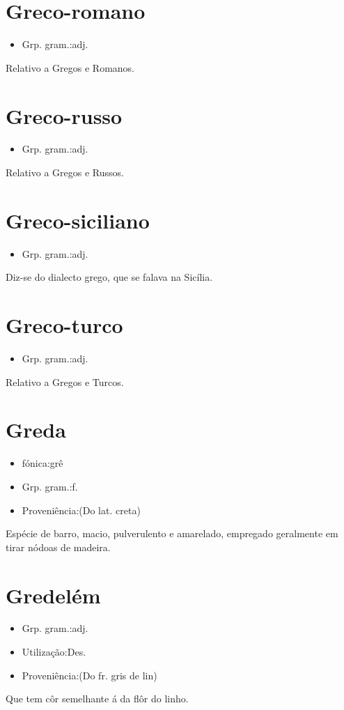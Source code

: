 \section{Greco-romano}
\begin{itemize}
\item {Grp. gram.:adj.}
\end{itemize}
Relativo a Gregos e Romanos.
\section{Greco-russo}
\begin{itemize}
\item {Grp. gram.:adj.}
\end{itemize}
Relativo a Gregos e Russos.
\section{Greco-siciliano}
\begin{itemize}
\item {Grp. gram.:adj.}
\end{itemize}
Diz-se do dialecto grego, que se falava na Sicília.
\section{Greco-turco}
\begin{itemize}
\item {Grp. gram.:adj.}
\end{itemize}
Relativo a Gregos e Turcos.
\section{Greda}
\begin{itemize}
\item {fónica:grê}
\end{itemize}
\begin{itemize}
\item {Grp. gram.:f.}
\end{itemize}
\begin{itemize}
\item {Proveniência:(Do lat. \textunderscore creta\textunderscore )}
\end{itemize}
Espécie de barro, macio, pulverulento e amarelado, empregado geralmente em tirar nódoas de madeira.
\section{Gredelém}
\begin{itemize}
\item {Grp. gram.:adj.}
\end{itemize}
\begin{itemize}
\item {Utilização:Des.}
\end{itemize}
\begin{itemize}
\item {Proveniência:(Do fr. \textunderscore gris de lin\textunderscore )}
\end{itemize}
Que tem côr semelhante á da flôr do linho.

